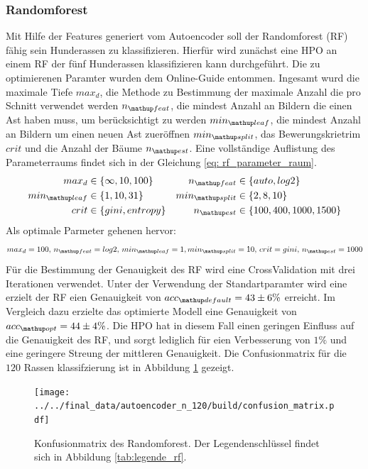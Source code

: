 \subsubsection{Randomforest}
Mit Hilfe der Features generiert vom Autoencoder soll der
Randomforest (RF) fähig sein Hunderassen zu klassifizieren.
Hierfür wird zunächst eine HPO an einem RF der fünf Hunderassen klassifizieren kann
durchgeführt. Die zu optimierenen Paramter
wurden dem Online-Guide \cite{RF_parameterraum} entommen. Ingesamt
wurd die maximale Tiefe $max_d$, die Methode zu Bestimmung der maximale Anzahl die pro Schnitt verwendet werden
$n\ua{feat}$, die mindest Anzahl an Bildern die einen Ast haben muss, um berücksichtigt zu werden
$min\ua{leaf}$, die mindest  Anzahl an Bildern um einen neuen Ast zueröffnen $min\ua{split}$,
das Bewerungskrietrim $crit$ und die Anzahl der Bäume $n\ua{est}$.
Eine vollständige Auflistung des Parameterraums findet sich in der Gleichung \eqref{eq: rf_parameter_raum}.
\begin{align}
  \begin{aligned}
    \label{eq: rf_parameter_raum}
    max_d &\in \left\{\infty, 10, 100\right\} & n\ua{feat}&\in\left\{auto, log2\right\}\\
    min\ua{leaf} &\in \left\{1, 10, 31\right\} & min\ua{split}&\in\left\{2, 8, 10\right\}\\
    crit &\in \left\{gini, entropy\right\} & n\ua{est}&\in\left\{100, 400, 1000, 1500 \right\}
  \end{aligned}
\end{align}
Als optimale Parmeter gehenen hervor:
\begin{equation*}
  max_d = 100,\, n\ua{feat}= log2, \, min\ua{leaf}= 1, min\ua{split}=10, \,   crit= gini, \, n\ua{est}=1000
\end{equation*}
Für die Bestimmung der Genauigkeit des RF wird eine CrossValidation mit
drei Iterationen verwendet. Unter der Verwendung der Standartparamter wird eine
erzielt der RF eien Genauigkeit von $acc\ua{default}=43\pm6\%$ erreicht.
Im Vergleich dazu erzielte das optimierte Modell eine Genauigkeit von $acc\ua{opt}=44\pm4\%$.
Die HPO hat in diesem Fall einen geringen Einfluss auf die Genauigkeit des RF,
und sorgt lediglich für eien Verbesserung von $1\%$ und eine geringere Streung
der mittleren Genauigkeit.
Die Confusionmatrix für die $120$ Rassen klassifzierung ist in Abbildung
\ref{fig:Confusionmatrix_rf} gezeigt.
\begin{figure}
\centering
\texttt{[image: ../../final\_data/autoencoder\_n\_120/build/confusion\_matrix.pdf]}
\caption{Konfusionmatrix des Randomforest. Der Legendenschlüssel findet sich in
Abbildung \ref{tab:legende_rf}.}
\label{fig:Confusionmatrix_rf}
\end{figure}
